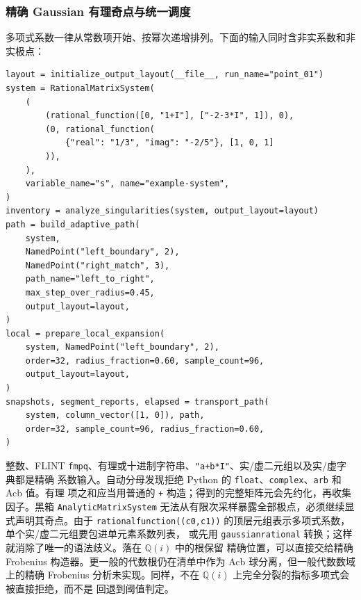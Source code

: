 \documentclass[11pt,a4paper]{ctexart}
\renewcommand{\_}{\origunderscore\allowbreak}
\begin{document}
\subsubsection{精确 Gaussian 有理奇点与统一调度}

多项式系数一律从常数项开始、按幂次递增排列。下面的输入同时含非实系数和非实极点：
\begin{verbatim}
layout = initialize_output_layout(__file__, run_name="point_01")
system = RationalMatrixSystem(
    (
        (rational_function([0, "1+I"], ["-2-3*I", 1]), 0),
        (0, rational_function(
            {"real": "1/3", "imag": "-2/5"}, [1, 0, 1]
        )),
    ),
    variable_name="s", name="example-system",
)
inventory = analyze_singularities(system, output_layout=layout)
path = build_adaptive_path(
    system,
    NamedPoint("left_boundary", 2),
    NamedPoint("right_match", 3),
    path_name="left_to_right",
    max_step_over_radius=0.45,
    output_layout=layout,
)
local = prepare_local_expansion(
    system, NamedPoint("left_boundary", 2),
    order=32, radius_fraction=0.60, sample_count=96,
    output_layout=layout,
)
snapshots, segment_reports, elapsed = transport_path(
    system, column_vector([1, 0]), path,
    order=32, sample_count=96, radius_fraction=0.60,
)
\end{verbatim}
整数、FLINT \texttt{fmpq}、有理或十进制字符串、\texttt{"a+b*I"}、实/虚二元组以及实/虚字典都是精确
系数输入。自动分母发现拒绝 Python 的 \texttt{float}、\texttt{complex}、\texttt{arb} 和 Acb 值。有理
项之和应当用普通的 \texttt{+} 构造；得到的完整矩阵元会先约化，再收集因子。黑箱
\texttt{AnalyticMatrixSystem} 无法从有限次采样暴露全部极点，必须继续显式声明其奇点。由于
\texttt{rational\_function((c0,c1))} 的顶层元组表示多项式系数，单个实/虚二元组要包进单元素系数列表，
或先用 \texttt{gaussian\_rational} 转换；这样就消除了唯一的语法歧义。落在 $\mathbb Q(i)$ 中的根保留
精确位置，可以直接交给精确 Frobenius 构造器。更一般的代数根仍在清单中作为 Acb 球分离，但一般代数数域
上的精确 Frobenius 分析未实现。同样，不在 $\mathbb Q(i)$ 上完全分裂的指标多项式会被直接拒绝，而不是
回退到阈值判定。
\end{document}

